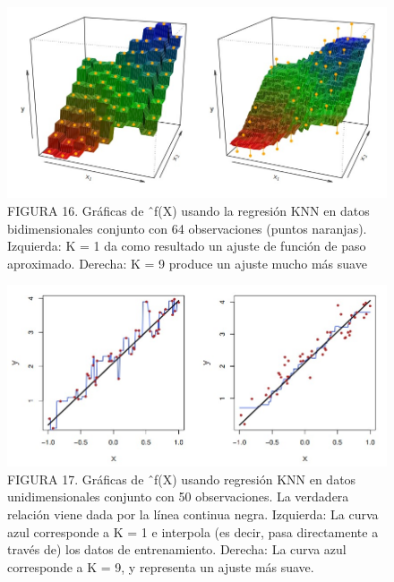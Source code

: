 \documentclass[
  letterpaper,
  DIV=11,
  numbers=noendperiod]{scrartcl}
\begin{document}
\begin{figure}

{\centering \includegraphics{images/holas.jpg}

}

\caption{FIGURA 16. Gráficas de ˆf(X) usando la regresión KNN en datos
bidimensionales conjunto con 64 observaciones (puntos naranjas).
Izquierda: K = 1 da como resultado un ajuste de función de paso
aproximado. Derecha: K = 9 produce un ajuste mucho más suave}

\end{figure}

\begin{figure}

{\centering \includegraphics{images/ll.jpg}

}

\caption{FIGURA 17. Gráficas de ˆf(X) usando regresión KNN en datos
unidimensionales conjunto con 50 observaciones. La verdadera relación
viene dada por la línea continua negra. Izquierda: La curva azul
corresponde a K = 1 e interpola (es decir, pasa directamente a través
de) los datos de entrenamiento. Derecha: La curva azul corresponde a K =
9, y representa un ajuste más suave.}

\end{figure}
\end{document}
